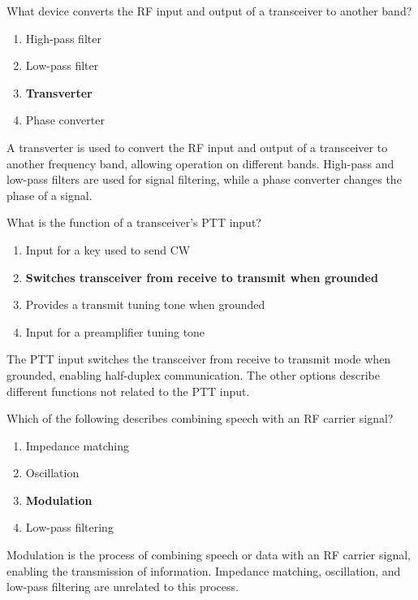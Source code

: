 
\begin{tcolorbox}[colback=gray!10!white,colframe=black!75!black,title={T7A06}]
    What device converts the RF input and output of a transceiver to another band?
    \begin{enumerate}[label=\Alph*),noitemsep]
        \item High-pass filter
        \item Low-pass filter
        \item \textbf{Transverter}
        \item Phase converter
    \end{enumerate}
\end{tcolorbox}
A transverter is used to convert the RF input and output of a transceiver to another frequency band, allowing operation on different bands. High-pass and low-pass filters are used for signal filtering, while a phase converter changes the phase of a signal.


\begin{tcolorbox}[colback=gray!10!white,colframe=black!75!black,title={T7A07}]
    What is the function of a transceiver’s PTT input?
    \begin{enumerate}[label=\Alph*),noitemsep]
        \item Input for a key used to send CW
        \item \textbf{Switches transceiver from receive to transmit when grounded}
        \item Provides a transmit tuning tone when grounded
        \item Input for a preamplifier tuning tone
    \end{enumerate}
\end{tcolorbox}
The PTT input switches the transceiver from receive to transmit mode when grounded, enabling half-duplex communication. The other options describe different functions not related to the PTT input.


\begin{tcolorbox}[colback=gray!10!white,colframe=black!75!black,title={T7A08}]
    Which of the following describes combining speech with an RF carrier signal?
    \begin{enumerate}[label=\Alph*),noitemsep]
        \item Impedance matching
        \item Oscillation
        \item \textbf{Modulation}
        \item Low-pass filtering
    \end{enumerate}
\end{tcolorbox}
Modulation is the process of combining speech or data with an RF carrier signal, enabling the transmission of information. Impedance matching, oscillation, and low-pass filtering are unrelated to this process.

